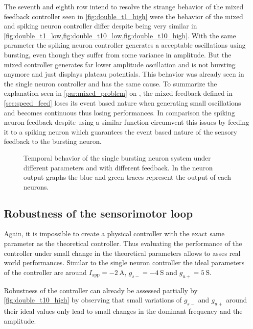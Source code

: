 The seventh and eighth row intend to resolve the strange behavior of the mixed feedback controller seen in \cref{fig:double_t1_high} were the behavior of the mixed and spiking neuron controller differ despite being very similar in \cref{fig:double_t1_low,fig:double_t10_low,fig:double_t10_high}.
With the same parameter the spiking neuron controller generates a acceptable oscillations using bursting, even though they suffer from some variance in amplitude. But the mixed controller generates far lower amplitude oscillation and is not bursting anymore and just displays plateau potentials.
This behavior was already seen in the single neuron controller and has the same cause.
To summarize the explanation seen in \cref{par:mixed_problem} on , the mixed feedback defined in \cref{sec:speed_feed} loses its event based nature when generating small oscillations and becomes continuous thus losing performances. 
In comparison the spiking neuron feedback despite using a similar function circumvent this issues by feeding it to a spiking neuron which guarantees the event based nature of the sensory feedback to the bursting neuron.

\begin{figure}[!htbp]
    \centering
    \caption{Temporal behavior of the single bursting neuron system under different parameters and with different feedback. In the neuron output graphs the blue and green traces represent the output of each neurons.}
    \label{fig:double_control_traces}
\end{figure}

\subsection{Robustness of the sensorimotor loop}

Again, it is impossible to create a physical controller with the exact same parameter as the theoretical controller. 
Thus evaluating the performance of the controller under small change in the theoretical parameters allows to asses real world performances.
Similar to the single neuron controller the ideal parameters of the controller are around $I_\text{app} = \qty{-2}{\ampere}$, $g_{s-} = \qty{-4}{\siemens}$ and $g_{u+} = \qty{5}{\siemens}$. 

Robustness of the controller can already be assessed partially by \cref{fig:double_t10_high} by observing that small variations of $g_{s-}$ and $g_{u+}$ around their ideal values only lead to small changes in the dominant frequency and the amplitude.

